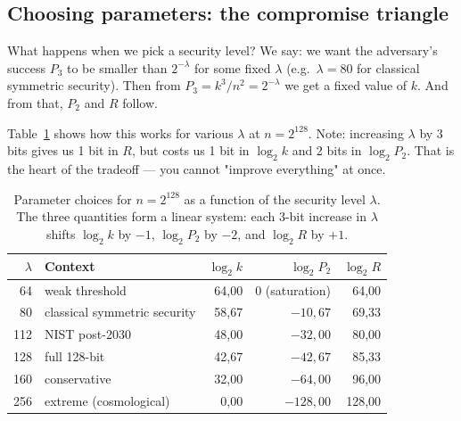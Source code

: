 \documentclass[11pt,a4paper]{article}
\begin{document}
\subsection{Choosing parameters: the compromise triangle}\label{pop:lambda-table}

What happens when we pick a security level? We say: we want the adversary's success $P_3$ to be smaller than $2^{-\lambda}$ for some fixed $\lambda$ (e.g.\ $\lambda = 80$ for classical symmetric security). Then from $P_3 = k^3 / n^2 = 2^{-\lambda}$ we get a fixed value of $k$. And from that, $P_2$ and $R$ follow.

Table~\ref{tab:pop-lambda} shows how this works for various $\lambda$ at $n = 2^{128}$. Note: increasing $\lambda$ by 3 bits gives us 1 bit in $R$, but costs us 1 bit in $\log_2 k$ and 2 bits in $\log_2 P_2$. That is the heart of the tradeoff --- you cannot "improve everything" at once.

\begin{table}[ht]
\centering
\small
\begin{tabular}{rlrrr}
\toprule
$\lambda$ & Context & $\log_2 k$ & $\log_2 P_2$ & $\log_2 R$ \\
\midrule
64 & weak threshold & 64{,}00 & 0 (saturation) & 64{,}00 \\
80 & classical symmetric security & 58{,}67 & $-10{,}67$ & 69{,}33 \\
112 & NIST post-2030 & 48{,}00 & $-32{,}00$ & 80{,}00 \\
128 & full 128-bit & 42{,}67 & $-42{,}67$ & 85{,}33 \\
160 & conservative & 32{,}00 & $-64{,}00$ & 96{,}00 \\
256 & extreme (cosmological) & 0{,}00 & $-128{,}00$ & 128{,}00 \\
\bottomrule
\end{tabular}
\caption{Parameter choices for $n = 2^{128}$ as a function of the security level $\lambda$. The three quantities form a linear system: each 3-bit increase in $\lambda$ shifts $\log_2 k$ by $-1$, $\log_2 P_2$ by $-2$, and $\log_2 R$ by $+1$.}
\label{tab:pop-lambda}
\end{table}
\end{document}
